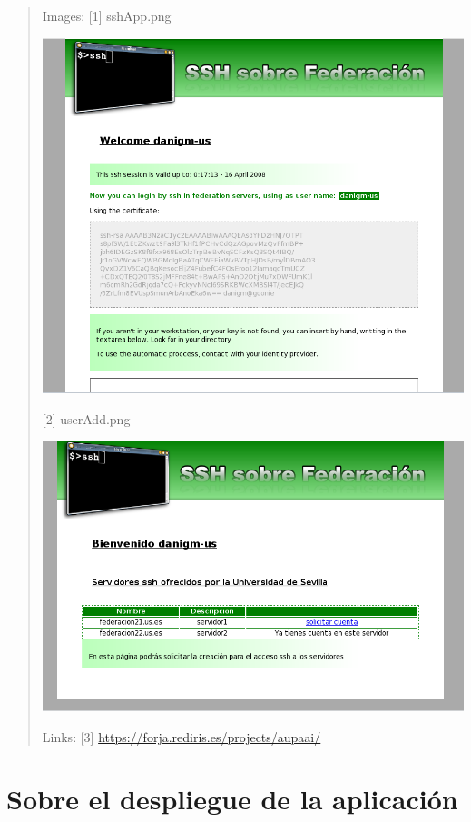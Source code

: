 \begin{quote}
Images:
    [1] sshApp.png
        \begin{center}
            \includegraphics[width=\textwidth]{img/sshApp.png}
        \end{center}
    [2] userAdd.png
        \begin{center}
            \includegraphics[width=\textwidth]{img/userAdd.png}
        \end{center}
Links:
    [3] \url{https://forja.rediris.es/projects/aupaai/}

    \end{quote}

\section{Sobre el despliegue de la aplicación}


